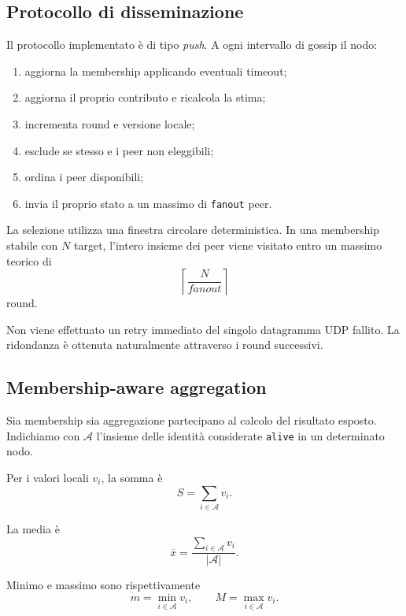 \documentclass[conference]{IEEEtran}
\begin{document}
\subsection{Protocollo di disseminazione}

Il protocollo implementato è di tipo \emph{push}. A ogni intervallo di gossip il nodo:

\begin{enumerate}
    \item aggiorna la membership applicando eventuali timeout;
    \item aggiorna il proprio contributo e ricalcola la stima;
    \item incrementa round e versione locale;
    \item esclude se stesso e i peer non eleggibili;
    \item ordina i peer disponibili;
    \item invia il proprio stato a un massimo di \texttt{fanout} peer.
\end{enumerate}

La selezione utilizza una finestra circolare deterministica. In una membership stabile con $N$ target, l'intero insieme dei peer viene visitato entro un massimo teorico di
\begin{equation}
\left\lceil\frac{N}{fanout}\right\rceil
\end{equation}
round.

Non viene effettuato un retry immediato del singolo datagramma UDP fallito. La ridondanza è ottenuta naturalmente attraverso i round successivi.

\subsection{Membership-aware aggregation}

Sia membership sia aggregazione partecipano al calcolo del risultato esposto. Indichiamo con $\mathcal{A}$ l'insieme delle identità considerate \texttt{alive} in un determinato nodo.

Per i valori locali $v_i$, la somma è
\begin{equation}
S=\sum_{i\in\mathcal{A}} v_i.
\end{equation}

La media è
\begin{equation}
\overline{x}=\frac{\sum_{i\in\mathcal{A}} v_i}{|\mathcal{A}|}.
\end{equation}

Minimo e massimo sono rispettivamente
\begin{equation}
m=\min_{i\in\mathcal{A}} v_i,
\qquad
M=\max_{i\in\mathcal{A}} v_i.
\end{equation}
\end{document}
